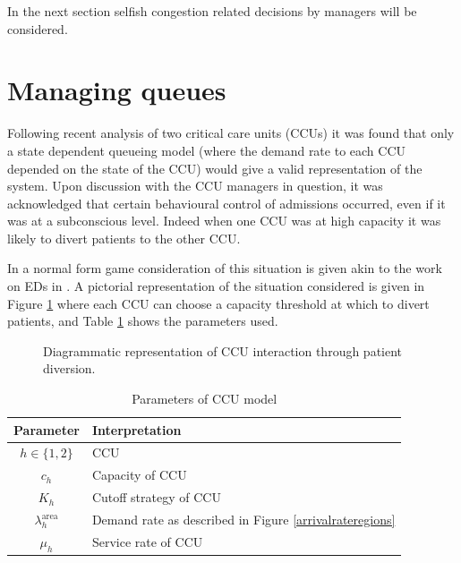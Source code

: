 \documentclass[a4paper,11pt]{article}
\begin{document}
In the next section selfish congestion related decisions by managers will be considered.

\section{Managing queues}\label{sec:managingqueues}

Following recent analysis of two critical care units (CCUs) it was found that only a state dependent queueing model (where the demand rate to each CCU depended on the state of the CCU) would give a valid representation of the system.
Upon discussion with the CCU managers in question, it was acknowledged that certain behavioural control of admissions occurred, even if it was at a subconscious level.
Indeed when one CCU was at high capacity it was likely to divert patients to the other CCU.

In \cite{knight2014} a normal form game consideration of this situation is given akin to the work on EDs in \cite{Deo2011}.
A pictorial representation of the situation considered is given in Figure \ref{diagramofdiversion} where each CCU can choose a capacity threshold at which to divert patients, and Table \ref{tab:parameters1} shows the parameters used.

\begin{figure}[!htbp]
\begin{center}
\caption{Diagrammatic representation of CCU interaction through patient diversion.}\label{diagramofdiversion}
\end{center}
\end{figure}


\begin{table}[!hbtp]
\begin{center}
\begin{tabular}{cl}
\toprule
Parameter & Interpretation\\
\midrule
$h\in\{1,2\}$& CCU\\
$c_h$& Capacity of CCU\\
$K_h$& Cutoff strategy of CCU\\
$\lambda_{h}^{\text{area}}$& Demand rate as described in Figure \ref{arrivalrateregions}\\
$\mu_{h}$&Service rate of CCU\\
\toprule
\end{tabular}
\caption{Parameters of CCU model}\label{tab:parameters1}
\end{center}
\end{table}
\end{document}
